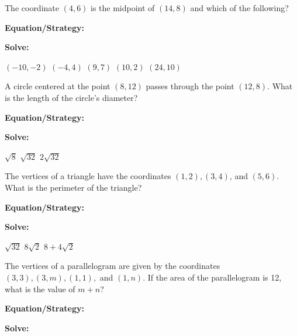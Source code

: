 \vfill
\newpage
\begin{multicols*}{2}
\begin{outline}[enumerate]
\medium

\1 The coordinate $(4,6)$ is the midpoint of $(14, 8)$ and which of the following?

\bigskip
\textbf{Equation/Strategy:} \hrulefill

\bigskip
\textbf{Solve:}

\vfill
\2 $(-10,-2)$
\2 $(-4,4)$
\2 $(9,7)$
\2 $(10,2)$
\2 $(24,10)$

\midline

\bigskip
\1 A circle centered at the point $(8,12)$ passes through the point $(12,8)$. What is the length of the circle's diameter?

\bigskip
\textbf{Equation/Strategy:} \hrulefill

\bigskip
\textbf{Solve:}

\vfill
\2 $\sqrt{8}$
\2 $\sqrt{32}$
\2 $2\sqrt{32}$

\columnbreak
\advanced

\1 The vertices of a triangle have the coordinates $(1,2), (3,4)$, and $(5,6)$. What is the perimeter of the triangle?

\bigskip
\textbf{Equation/Strategy:} \hrulefill

\bigskip
\textbf{Solve:}

\vfill
\2 $\sqrt{32}$
\2 $8\sqrt{2}$
\2 $8+4\sqrt{2}$

\midline

\1 The vertices of a parallelogram are given by the coordinates $(3,3), (3,m), (1,1),$ and $(1,n)$. If the area of the parallelogram is 12, what is the value of $m+n$?

\bigskip
\textbf{Equation/Strategy:}

\bigskip
\textbf{Solve:}

\vfill
{}
\end{outline}
\end{multicols*}